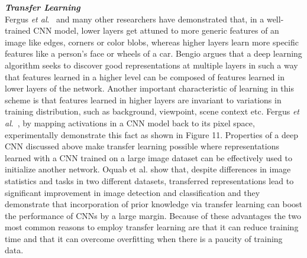 \documentclass [11pt,letterpaper ,twoside ,openany ]{report}
\begin{document}
    \noindent
    \textbf{\textit{Transfer Learning}}\\
    Fergus \textit {et al}.\ \cite{zeiler2014visualizing} and many other researchers \cite{bengio2012deep, oquab2014learning} have demonstrated that, in a well-trained CNN model, lower layers get attuned to more generic features of an image like edges, corners or color blobs, whereas higher layers learn more specific features like a person's face or wheels of a car. Bengio \cite{bengio2012deep} argues that a deep learning algorithm seeks to discover good representations at multiple layers  in such a way that features learned in a higher level can be composed of features learned in lower layers of the network. Another important characteristic of learning in this scheme is that features learned in higher layers are invariant to variations in training distribution, such as background, viewpoint, scene context etc. Fergus \textit{et al}.\ \cite{zeiler2014visualizing}, by mapping activations in a CNN model back to its pixel space, experimentally demonstrate this fact as shown in Figure 11. Properties of a deep CNN discussed above make transfer learning possible where representations learned with a CNN trained on a large image dataset can be effectively used to  initialize another network. Oquab et al. \cite{oquab2014learning} show that, despite differences in image statistics and tasks in two different datasets, transferred representations lead to significant improvement in image detection and classification and they demonstrate that incorporation of prior knowledge via transfer learning can boost the performance of CNNs by a large margin. Because of these advantages the two most common reasons to employ transfer learning are that it can reduce training time and that it can overcome overfitting when there is a paucity of training data.
\end{document}

